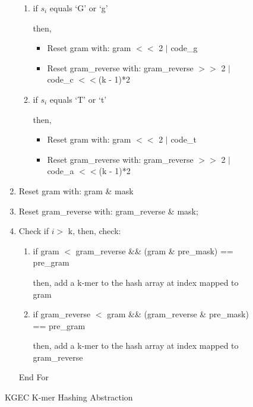 \documentclass[12pt,openany]{llncs}
\begin{document}
\begin{figure}
\begin{bordered}
\begin{enumerate}
\begin{enumerate}
	\item if $s_i$ equals `G' or `g'
	
	\noindent\hspace{1cm}then,

	\begin{itemize}
    \addtolength{\itemindent}{1cm}	
     	\item Reset gram with: gram $<<$ 2 $|$ code\_g
      	\item Reset gram\_reverse with: gram\_reverse $>>$ 2 $|$ code\_c $<<$(k - 1)*2
	\end{itemize}
	
	\item if $s_i$ equals `T' or `t'
	
	\noindent\hspace{1cm}then,

	\begin{itemize}
    \addtolength{\itemindent}{1cm}
      \item Reset gram with: gram $<<$ 2 $|$ code\_t
	  \item Reset gram\_reverse with: gram\_reverse $>>$ 2 $|$ code\_a $<<$(k - 1)*2
	\end{itemize}

\end{enumerate}

\item Reset gram with: gram \& mask

\item Reset gram\_reverse with: gram\_reverse \& mask;

\item Check if $i >$ k, then, check:
\vspace{-2mm}
\begin{enumerate}
\addtolength{\itemindent}{1cm}
      \item if gram $<$ gram\_reverse \&\& (gram \& pre\_mask) == pre\_gram
      	
      \noindent\hspace{1cm}then, add a k-mer to the hash array at index mapped to gram
	   
	  \item if gram\_reverse $<$ gram \&\& (gram\_reverse \& pre\_mask) == pre\_gram
	  
      \noindent\hspace{1cm}then, add a k-mer to the hash array at index mapped to gram\_reverse
	  
\end{enumerate}            
End For	
\end{enumerate}
\end{bordered}
\caption{\label{fig:fig-KGEC-HASH}KGEC K-mer Hashing Abstraction}
\end{figure}
\end{document}
